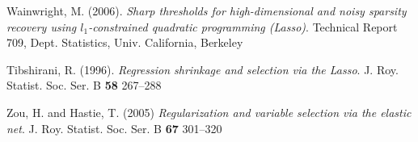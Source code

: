 \documentclass[letterpaper,12pt]{article}
\begin{document}
\begin{thebibliography}{9}
  Wainwright, M. (2006).
  \textit{Sharp thresholds for high-dimensional and noisy sparsity
    recovery using $l_1$-constrained quadratic programming (Lasso)}.
  Technical Report 709, Dept. Statistics, Univ. California,
  Berkeley

  Tibshirani, R. (1996).
  \textit{Regression shrinkage and selection via the Lasso}.
  J. Roy. Statist. Soc. Ser. B \textbf{58} 267--288

  Zou, H. and Hastie, T. (2005)
  \textit{Regularization and variable selection via the elastic net}.
  J. Roy. Statist. Soc. Ser. B \textbf{67} 301--320

\end{thebibliography}
\end{document}
